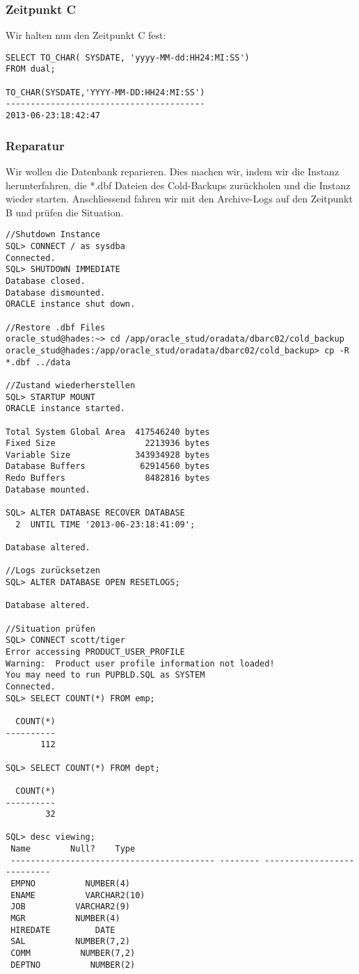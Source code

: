 \documentclass[11pt,a4paper,parskip=half]{scrartcl}
\begin{document}
\subsubsection{Zeitpunkt C}
Wir halten nun den Zeitpunkt C fest:
\begin{lstlisting}
SELECT TO_CHAR( SYSDATE, 'yyyy-MM-dd:HH24:MI:SS')
FROM dual;

TO_CHAR(SYSDATE,'YYYY-MM-DD:HH24:MI:SS')
----------------------------------------
2013-06-23:18:42:47     
\end{lstlisting}

\subsubsection{Reparatur}
Wir wollen die Datenbank reparieren. Dies machen wir, indem wir die Instanz herunterfahren, die *.dbf Dateien des Cold-Backups zurückholen und die Instanz wieder starten. Anschliessend fahren wir mit den Archive-Logs auf den Zeitpunkt B und prüfen die Situation.

\begin{lstlisting}
//Shutdown Instance
SQL> CONNECT / as sysdba
Connected.
SQL> SHUTDOWN IMMEDIATE
Database closed.
Database dismounted.
ORACLE instance shut down.

//Restore .dbf Files
oracle_stud@hades:~> cd /app/oracle_stud/oradata/dbarc02/cold_backup
oracle_stud@hades:/app/oracle_stud/oradata/dbarc02/cold_backup> cp -R *.dbf ../data

//Zustand wiederherstellen
SQL> STARTUP MOUNT
ORACLE instance started.

Total System Global Area  417546240 bytes
Fixed Size                  2213936 bytes
Variable Size             343934928 bytes
Database Buffers           62914560 bytes
Redo Buffers                8482816 bytes
Database mounted.

SQL> ALTER DATABASE RECOVER DATABASE
  2  UNTIL TIME '2013-06-23:18:41:09';

Database altered.

//Logs zurücksetzen
SQL> ALTER DATABASE OPEN RESETLOGS;

Database altered.

//Situation prüfen
SQL> CONNECT scott/tiger
Error accessing PRODUCT_USER_PROFILE
Warning:  Product user profile information not loaded!
You may need to run PUPBLD.SQL as SYSTEM
Connected.
SQL> SELECT COUNT(*) FROM emp;

  COUNT(*)
----------
       112

SQL> SELECT COUNT(*) FROM dept;

  COUNT(*)
----------
        32

SQL> desc viewing;
 Name        Null?    Type
 ----------------------------------------- -------- ---------------------------
 EMPNO          NUMBER(4)
 ENAME          VARCHAR2(10)
 JOB          VARCHAR2(9)
 MGR          NUMBER(4)
 HIREDATE         DATE
 SAL          NUMBER(7,2)
 COMM          NUMBER(7,2)
 DEPTNO          NUMBER(2)
\end{lstlisting}
\end{document}

